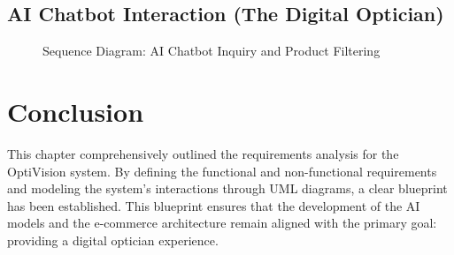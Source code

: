 \subsection{AI Chatbot Interaction (The Digital Optician)}
\begin{figure}[H]
    \centering
    \vspace{9cm}
    \caption{Sequence Diagram: AI Chatbot Inquiry and Product Filtering}
    \label{fig:seq_chatbot}
\end{figure}

\section{Conclusion}
\label{sec:req_conclusion}
This chapter comprehensively outlined the requirements analysis for the OptiVision system. By defining the functional and non-functional requirements and modeling the system's interactions through UML diagrams, a clear blueprint has been established. This blueprint ensures that the development of the AI models and the e-commerce architecture remain aligned with the primary goal: providing a digital optician experience.
